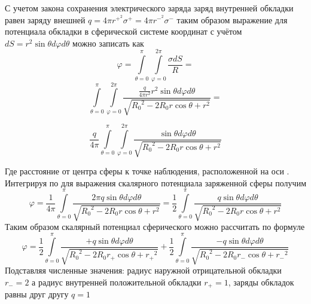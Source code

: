 ﻿\documentclass{article}
\begin{document}
С учетом закона сохранения электрического заряда заряд внутренней обкладки равен заряду внешней $q=4\pi {{r}^{{{+}^{2}}}}{{\sigma }^{+}}=4\pi {{r}^{{{-}^{2}}}}{{\sigma }^{-}}$ таким образом выражение для потенциала обкладки в сферической системе координат с учётом $dS={{r}^{2}}\sin \theta d\varphi d\theta $  можно записать как
	\[\varphi =\int\limits_{\theta =0}^{\pi }{\int\limits_{\varphi =0}^{2\pi }{\frac{\sigma dS}{R}}} = \]
 \[\int\limits_{\theta =0}^{\pi }{\int\limits_{\varphi =0}^{2\pi }{\frac{\frac{q}{4\pi {{r}^{2}}}{{r}^{2}}\sin \theta d\varphi d\theta }{\sqrt{{{R}_{0}}^{2}-2{{R}_{0}}r\cos \theta +{{r}^{2}}}}}} = \]

 \[\frac{q}{4\pi }\int\limits_{\theta =0}^{\pi }{\int\limits_{\varphi =0}^{2\pi }{\frac{\sin \theta d\varphi d\theta }{\sqrt{{{R}_{0}}^{2}-2{{R}_{0}}r\cos \theta +{{r}^{2}}}}}}\]

Где  расстояние от центра сферы к точке наблюдения, расположенной на оси . Интегрируя по  для выражения скалярного потенциала заряженной сферы получим
	\[\varphi =\frac{1}{4\pi }\int\limits_{\theta =0}^{\pi }{\frac{2\pi q\sin \theta d\varphi d\theta }{\sqrt{{{R}_{0}}^{2}-2{{R}_{0}}r\cos \theta +{{r}^{2}}}}}=\frac{1}{2}\int\limits_{\theta =0}^{\pi }{\frac{q\sin \theta d\varphi d\theta }{\sqrt{{{R}_{0}}^{2}-2{{R}_{0}}r\cos \theta +{{r}^{2}}}}}\] 	
Таким образом скалярный потенциал сферического можно рассчитать по формуле
	\[\varphi =\frac{1}{2}\int\limits_{\theta =0}^{\pi }{\frac{+q\sin \theta d\varphi d\theta }{\sqrt{{{R}_{0}}^{2}-2{{R}_{0}}{{r}_{+}}\cos \theta +{{r}_{+}}^{2}}}}+\frac{1}{2}\int\limits_{\theta =0}^{\pi }{\frac{-q\sin \theta d\varphi d\theta }{\sqrt{{{R}_{0}}^{2}-2{{R}_{0}}{{r}_{-}}\cos \theta +{{r}_{-}}^{2}}}}\] 	
Подставляя численные значения: радиус наружной отрицательной обкладки ${{r}_{-}}=2$ а радиус внутренней положительной обкладки ${{r}_{+}}=1$, заряды обкладок равны друг другу $q=1$ 
\end{document}

